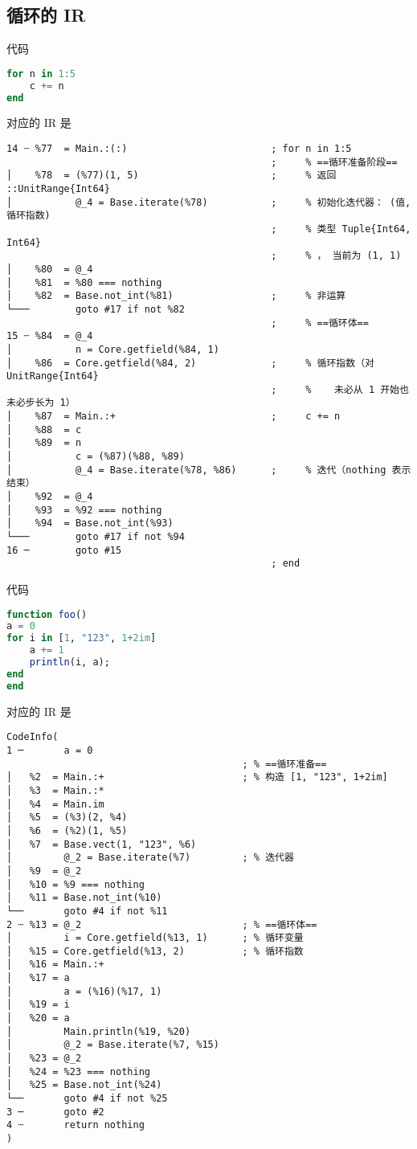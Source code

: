 \subsection{循环的 IR}
代码
\begin{lstlisting}[language=julia]
for n in 1:5
    c += n
end
\end{lstlisting}
对应的 IR 是
\begin{lstlisting}[language=none]
14 ┄ %77  = Main.:(:)                         ; for n in 1:5
                                              ;     % ==循环准备阶段==
│    %78  = (%77)(1, 5)                       ;     % 返回 ::UnitRange{Int64}
│           @_4 = Base.iterate(%78)           ;     % 初始化迭代器： (值, 循环指数)
                                              ;     % 类型 Tuple{Int64, Int64}
                                              ;     % ， 当前为 (1, 1)
│    %80  = @_4
│    %81  = %80 === nothing
│    %82  = Base.not_int(%81)                 ;     % 非运算
└───        goto #17 if not %82
                                              ;     % ==循环体==
15 ┄ %84  = @_4
│           n = Core.getfield(%84, 1)
│    %86  = Core.getfield(%84, 2)             ;     % 循环指数（对 UnitRange{Int64}
                                              ;     %    未必从 1 开始也未必步长为 1）
│    %87  = Main.:+                           ;     c += n
│    %88  = c
│    %89  = n
│           c = (%87)(%88, %89)
│           @_4 = Base.iterate(%78, %86)      ;     % 迭代（nothing 表示结束）
│    %92  = @_4
│    %93  = %92 === nothing
│    %94  = Base.not_int(%93)
└───        goto #17 if not %94
16 ─        goto #15
                                              ; end
\end{lstlisting}

代码
\begin{lstlisting}[language=julia]
function foo()
a = 0
for i in [1, "123", 1+2im]
    a += 1
    println(i, a);
end
end
\end{lstlisting}
对应的 IR 是
\begin{lstlisting}[language=none]
CodeInfo(
1 ─       a = 0
                                         ; % ==循环准备==
│   %2  = Main.:+                        ; % 构造 [1, "123", 1+2im]
│   %3  = Main.:*
│   %4  = Main.im
│   %5  = (%3)(2, %4)
│   %6  = (%2)(1, %5)
│   %7  = Base.vect(1, "123", %6)
│         @_2 = Base.iterate(%7)         ; % 迭代器
│   %9  = @_2
│   %10 = %9 === nothing
│   %11 = Base.not_int(%10)
└──       goto #4 if not %11
2 ┄ %13 = @_2                            ; % ==循环体==
│         i = Core.getfield(%13, 1)      ; % 循环变量
│   %15 = Core.getfield(%13, 2)          ; % 循环指数
│   %16 = Main.:+
│   %17 = a
│         a = (%16)(%17, 1)
│   %19 = i
│   %20 = a
│         Main.println(%19, %20)
│         @_2 = Base.iterate(%7, %15)
│   %23 = @_2
│   %24 = %23 === nothing
│   %25 = Base.not_int(%24)
└──       goto #4 if not %25
3 ─       goto #2
4 ┄       return nothing
)
\end{lstlisting}

